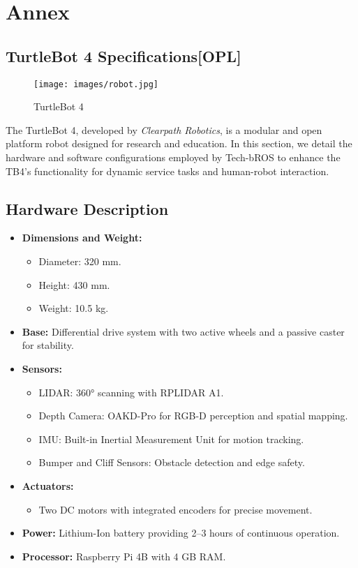 \section*{Annex}
\subsection*{TurtleBot 4 Specifications[OPL]}%
\label{sec:annex-SSPL}

\setlength\intextsep{0pt}
\begin{wrapfigure}[10]{r}{0.3\textwidth}
	\centering
	\texttt{[image: images/robot.jpg]}
	\caption{TurtleBot 4}%
	\label{fig:turtlebot4}
\end{wrapfigure}

The TurtleBot 4, developed by \textit{Clearpath Robotics}, is a modular and open platform robot designed for research and education. In this section, we detail the hardware and software configurations employed by Tech-bROS to enhance the TB4's functionality for dynamic service tasks and human-robot interaction.

\subsection*{Hardware Description}
\begin{itemize}
    \item \textbf{Dimensions and Weight:} 
        \begin{itemize}
            \item Diameter: 320 mm.
            \item Height: 430 mm.
            \item Weight: 10.5 kg.
        \end{itemize}
    \item \textbf{Base:} Differential drive system with two active wheels and a passive caster for stability.
    \item \textbf{Sensors:}
        \begin{itemize}
            \item LIDAR: 360° scanning with RPLIDAR A1.
            \item Depth Camera: OAKD-Pro for RGB-D perception and spatial mapping.
            \item IMU: Built-in Inertial Measurement Unit for motion tracking.
            \item Bumper and Cliff Sensors: Obstacle detection and edge safety.
        \end{itemize}
    \item \textbf{Actuators:} 
        \begin{itemize}
            \item Two DC motors with integrated encoders for precise movement.
        \end{itemize}
    \item \textbf{Power:} Lithium-Ion battery providing 2–3 hours of continuous operation.
    \item \textbf{Processor:} Raspberry Pi 4B with 4 GB RAM.
\end{itemize}

